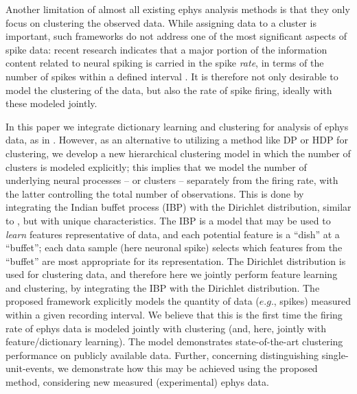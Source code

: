 \documentclass[journal]{IEEEtran}
\begin{document}
Another limitation of almost all existing ephys analysis methods is that they only focus on clustering the observed data. While assigning data to a cluster is important, such frameworks do not address one of the most significant aspects of spike data: recent research indicates that a major portion of the  information content related to neural spiking is carried in the spike \emph{rate}, in terms of the number of spikes within a defined interval \cite{Donoghue07}. It is therefore not only desirable to model the clustering of the data, but also the rate of spike firing, ideally with these modeled jointly.

In this paper we integrate dictionary learning and clustering for analysis of ephys data, as in \cite{Dilan,Bo2011}. However, as an alternative to utilizing a method like DP or HDP \cite{Wood2009,Bo2011} for clustering, we develop a new hierarchical clustering model in which the number of clusters is modeled explicitly; this implies that we model the number of underlying neural processes -- or clusters -- separately from the firing rate, with the latter controlling the total number of observations. This is done by integrating the Indian buffet process (IBP) \cite{IBP} with the Dirichlet distribution, similar to \cite{compound}, but with unique characteristics. The IBP is a model that may be used to \emph{learn} features representative of data, and each potential feature is a ``dish'' at a ``buffet''; each data sample (here neuronal spike) selects which features from the ``buffet'' are most appropriate for its representation. The Dirichlet distribution is used for clustering data, and therefore here we jointly perform feature learning and clustering, by integrating the IBP with the Dirichlet distribution. The proposed framework explicitly models the quantity of data ($e.g.$, spikes) measured within a given recording interval. We believe that this is the first time the firing rate of ephys data is modeled jointly with clustering (and, here, jointly with feature/dictionary learning). The model demonstrates state-of-the-art clustering performance on publicly available data. Further, concerning distinguishing single-unit-events, we demonstrate how this may be achieved using the proposed method, considering new measured (experimental) ephys data.
\end{document}
